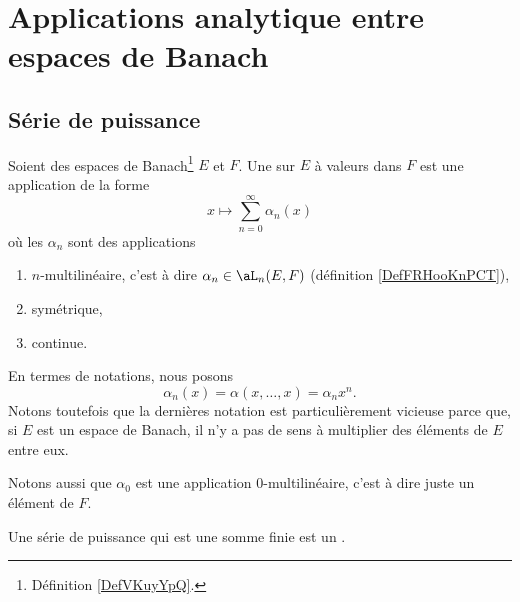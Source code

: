 

\section{Applications analytique entre espaces de Banach}

\subsection{Série de puissance}


\begin{definition}	\label{DEFooIXGBooPgJTzB}
	Soient des espaces de Banach\footnote{Définition \ref{DefVKuyYpQ}.} \( E\) et \( F\).
	Une  sur \( E\) à valeurs dans \( F\) est une application de la forme
	\begin{equation}
		x\mapsto \sum_{n=0}^{\infty}\alpha_n(x)
	\end{equation}
	où les \( \alpha_n\) sont des applications
	\begin{enumerate}
		\item
		      \( n\)-multilinéaire, c'est à dire \( \alpha_n\in \aL_n(E,F)\) (définition \ref{DefFRHooKnPCT}),
		\item
		      symétrique,
		\item
		      continue.
	\end{enumerate}
	En termes de notations, nous posons
	\begin{equation}
		\alpha_n(x)=\alpha(x,\ldots,x)=\alpha_nx^n.
	\end{equation}
	Notons toutefois que la dernières notation est particulièrement vicieuse parce que, si \( E\) est un espace de Banach, il n'y a pas de sens à multiplier des éléments de \( E\) entre eux.

	Notons aussi que \( \alpha_0\) est une application \( 0\)-multilinéaire, c'est à dire juste un élément de \( F\).
\end{definition}

\begin{definition}	\label{DEFooZUYHooDwwRfp}
	Une série de puissance qui est une somme finie est un .
\end{definition}


